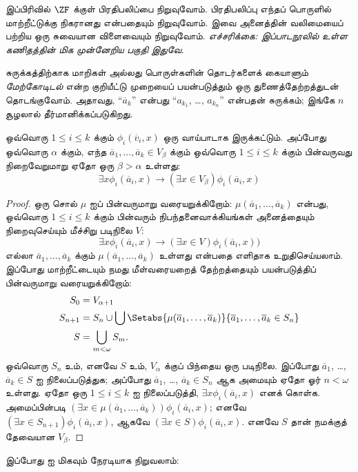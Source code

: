 \documentclass[../../../include/open-logic-section]{subfiles}
\begin{document}

இப்பிரிவில் $\ZF$ க்குள் பிரதிபலிப்பை நிறுவுவோம். பிரதிபலிப்பு எந்தப்
பொருளில் மாற்றீட்டுக்கு நிகரானது என்பதையும் நிறுவுவோம். இவை அனைத்தின்
வலிமையைப் பற்றிய ஒரு சுவையான விளைவையும் நிறுவுவோம். \emph{எச்சரிக்கை:
இப்பாடநூலில் உள்ள கணிதத்தின் மிக முன்னேறிய பகுதி இதுவே.}

சுருக்கத்திற்காக மாறிகள் அல்லது பொருள்களின் தொடர்களைக் கையாளும்
\emph{மேற்கோடிடல்} என்ற குறியீட்டு முறையைப் பயன்படுத்தும் ஒரு
துணைத்தேற்றத்துடன் தொடங்குவோம். அதாவது, ``$\overline{a}_k$'' என்பது
``$a_{k_1}$, \dots, $a_{k_n}$'' என்பதன் சுருக்கம்; இங்கே $n$ சூழலால்
தீர்மானிக்கப்படுகிறது.

\begin{lem}
ஒவ்வொரு $1 \leq i \leq k$ க்கும் $\phi_i(\overline{v}_i, x)$ ஒரு
வாய்பாடாக இருக்கட்டும். அப்போது ஒவ்வொரு $\alpha$ க்கும், எந்த
$\overline{a}_1, \ldots, \overline{a}_k \in V_\beta$ க்கும் ஒவ்வொரு
$1 \leq i \leq k$ க்கும் பின்வருவது நிறைவேறுமாறு ஏதோ ஒரு
$\beta > \alpha$ உள்ளது:
\[
	\exists x\phi_i(\overline{a}_i, x) \rightarrow (\exists x \in V_\beta) \phi_i(\overline{a}_i, x)
\]
\end{lem}

\begin{proof}
ஒரு சொல் $\mu$ ஐப் பின்வருமாறு வரையறுக்கிறோம்:
$\mu(\overline{a}_1, \ldots, \overline{a}_k)$ என்பது, ஒவ்வொரு
$1 \leq i \leq k$ க்கும் பின்வரும் நிபந்தனைவாக்கியங்கள் அனைத்தையும்
நிறைவுசெய்யும் மீச்சிறு படிநிலை $V$:
\[
\exists x\phi_i(\overline{a}_i, x) \rightarrow (\exists x \in V) \phi_i(\overline{a}_i, x))
\]
எல்லா $\overline{a}_1, \ldots, \overline{a}_k$ க்கும்
$\mu(\overline{a}_1, \ldots, \overline{a}_k)$ உள்ளது என்பதை எளிதாக
உறுதிசெய்யலாம். இப்போது மாற்றீட்டையும் நமது மீள்வரையறைத் தேற்றத்தையும்
பயன்படுத்திப் பின்வருமாறு வரையறுக்கிறோம்:
\begin{align*}
	S_0 & = V_{\alpha+1}\\
	S_{n+1} & = S_n \cup \bigcup
	\Setabs{\mu(\overline{a}_1, \ldots, \overline{a}_k)}
	{\overline{a}_1, \ldots, \overline{a}_k \in S_n} \\
	S &= \bigcup_{m < \omega} S_m.
\end{align*}
ஒவ்வொரு $S_n$ உம், எனவே $S$ உம், $V_\alpha$ க்குப் பிந்தைய ஒரு
படிநிலை. இப்போது $\overline{a}_1$, \dots,~$\overline{a}_k \in S$ ஐ
நிலைப்படுத்துக; அப்போது $\overline{a}_1$, \dots,
$\overline{a}_k \in S_n$ ஆக அமையும் ஏதோ ஓர் $n < \omega$ உள்ளது.
ஏதோ ஒரு $1 \leq i \leq k$ ஐ நிலைப்படுத்தி,
$\exists x \phi_i(\overline{a}_i,x)$ எனக் கொள்க. அமைப்பின்படி
$(\exists x \in \mu(\overline{a}_1, \ldots,
\overline{a}_k))\phi_i(\overline{a}_i, x)$; எனவே
$(\exists x \in S_{n+1})\phi_i(\overline{a}_i, x)$, ஆகவே
$(\exists x \in S)\phi_i(\overline{a}_i, x)$. எனவே $S$ தான் நமக்குத்
தேவையான $V_\beta$.
\end{proof}
\noindent
இப்போது  ஐ மிகவும்
நேரடியாக நிறுவலாம்:
\end{document}
